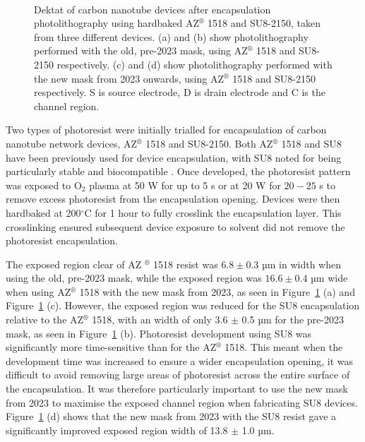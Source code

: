 \documentclass[
  a4paper,
]{scrbook}
\begin{document}
\begin{figure}
\begin{minipage}[t]{0.45\linewidth}
{{}

}

\end{minipage}%
%
\begin{minipage}[t]{0.01\linewidth}

{\centering 

~

}

\end{minipage}%

\caption{\label{fig-dektat-encapsulation}Dektat of carbon nanotube
devices after encapsulation photolithography using hardbaked
AZ\(^\circledR\) 1518 and SU8-2150, taken from three different devices.
(a) and (b) show photolithography performed with the old, pre-2023 mask,
using AZ\(^\circledR\) 1518 and SU8-2150 respectively. (c) and (d) show
photolithography performed with the new mask from 2023 onwards, using
AZ\(^\circledR\) 1518 and SU8-2150 respectively. S is source electrode,
D is drain electrode and C is the channel region.}

\end{figure}

Two types of photoresist were initially trialled for encapsulation of
carbon nanotube network devices, AZ\(^\circledR\) 1518 and SU8-2150.
Both AZ\(^\circledR\) 1518
\autocite{Murugathas2018,Murugathas2019a,Shkodra2021} and SU8 have been
previously used for device encapsulation, with SU8 noted for being
particularly stable and biocompatible
\autocite{Lee2006,Chen2021,Albarghouthi2022}. Once developed, the
photoresist pattern was exposed to O\(_2\) plasma at 50 W for up to 5 s
or at 20 W for \(20-25\) s to remove excess photoresist from the
encapsulation opening. Devices were then hardbaked at 200\(^\circ\)C for
1 hour to fully crosslink the encapsulation layer. This crosslinking
ensured subsequent device exposure to solvent did not remove the
photoresist encapsulation.

The exposed region clear of AZ \(^\circledR\) 1518 resist was
\(6.8 \pm 0.3\) µm in width when using the old, pre-2023 mask, while the
exposed region was \(16.6 \pm 0.4\) µm wide when using AZ\(^\circledR\)
1518 with the new mask from 2023, as seen in
Figure~\ref{fig-dektat-encapsulation} (a) and
Figure~\ref{fig-dektat-encapsulation} (c). However, the exposed region
was reduced for the SU8 encapsulation relative to the AZ\(^\circledR\)
1518, with an width of only 3.6 \(\pm\) 0.5 µm for the pre-2023 mask, as
seen in Figure~\ref{fig-dektat-encapsulation} (b). Photoresist
development using SU8 was significantly more time-sensitive than for the
AZ\(^\circledR\) 1518. This meant when the development time was
increased to ensure a wider encapsulation opening, it was difficult to
avoid removing large areas of photoresist across the entire surface of
the encapsulation. It was therefore particularly important to use the
new mask from 2023 to maximise the exposed channel region when
fabricating SU8 devices. Figure~\ref{fig-dektat-encapsulation} (d) shows
that the new mask from 2023 with the SU8 resist gave a significantly
improved exposed region width of 13.8 \(\pm\) 1.0 µm.
\end{document}
